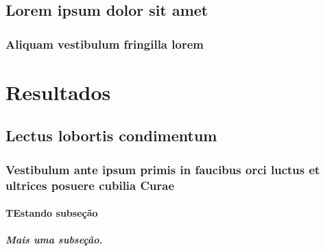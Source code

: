 \documentclass[
	12pt,				%
	openright,			%
    twoside,			%
	a4paper,			%
	english,			%
	french,				%
	spanish,			%
	brazil				%
	]{abntex2}
\numberwithin{lema}{chapter}
\numberwithin{teorema}{chapter}
\numberwithin{definicao}{chapter}
\numberwithin{figure}{chapter}
\begin{document}
\iffalse
\chapter{Lorem ipsum dolor sit amet}

\section{Aliquam vestibulum fringilla lorem}

\lipsum[1]

\lipsum[2-3]

\lipsum[1]

\lipsum[2-3]

\lipsum[1]

\lipsum[2-3]

\lipsum[1]

\lipsum[2-3]

\lipsum[1]

\lipsum[2-3]

\lipsum[1]

\lipsum[2-3]

\part{Resultados}

\chapter{Lectus lobortis condimentum}

\section{Vestibulum ante ipsum primis in faucibus orci luctus et ultrices
posuere cubilia Curae}

\lipsum[21-22]

\subsection{TEstando subseção}

\subsubsection{Mais uma subseção.}
\end{document}
